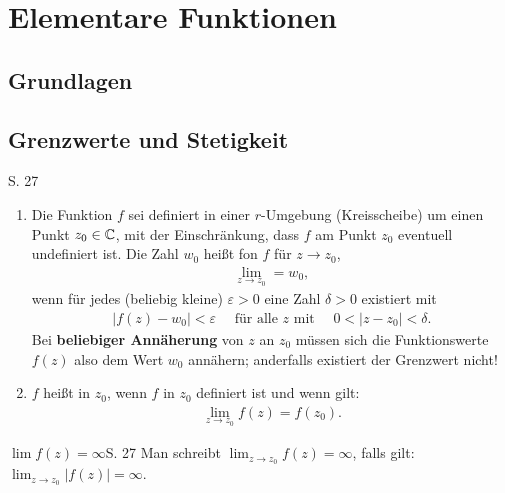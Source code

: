 \section{Elementare Funktionen}



\subsection{Grundlagen}



\subsection{Grenzwerte und Stetigkeit}

\begin{definition}{S. 27}
  \begin{enumerate}
    \item Die Funktion $f$ sei definiert in einer $r$-Umgebung (Kreisscheibe) um einen Punkt $z_0 \in \mathbb{C}$, mit der Einschränkung, dass $f$ am Punkt $z_0$ eventuell undefiniert ist.
      Die Zahl $w_0$ heißt  fon $f$ für $z \to z_0$,
      \begin{align}
        \lim_{z \to z_0} = w_0,
      \end{align}
      wenn für jedes (beliebig kleine) $\varepsilon > 0$ eine Zahl $\delta > 0$ existiert mit
      \begin{align}
        \left| f(z) -w_0 \right| < \varepsilon \quad \text{ für alle $z$ mit } \quad 0 < | z - z_0 | < \delta .
      \end{align}
      Bei \textbf{beliebiger Annäherung} von $z$ an $z_0$ müssen sich die Funktionswerte $f(z)$ also dem Wert $w_0$ annähern; anderfalls existiert der Grenzwert nicht!
    \item $f$ heißt  in $z_0$, wenn $f$ in $z_0$ definiert ist und wenn gilt:
      \begin{align}
        \lim_{z \to z_0} f(z) = f(z_0) .
      \end{align}
  \end{enumerate}
\end{definition}

\begin{bemerkung}{$\displaystyle \lim f(z) = \infty$}{S. 27}
  Man schreibt $\displaystyle \lim_{z \to z_0} f(z) = \infty$, falls gilt: $\displaystyle \lim_{z \to z_0} \left| f(z) \right| = \infty$.
\end{bemerkung}



